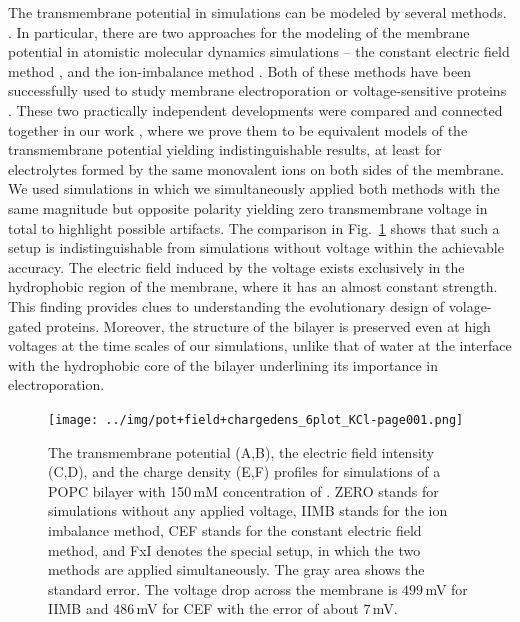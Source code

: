 The transmembrane potential in simulations can be modeled by several methods. \citep{Tieleman2001,Sin2015, Roux1997, sachs04_potential}.
In particular, 
there are two approaches for the modeling of 
the membrane potential in atomistic molecular dynamics simulations --
 the constant electric field method \citep{Roux1997,Roux2008,gumbart_constant_2012}, 
and
 the ion-imbalance method \citep{sachs04_potential,Delemotte2008}. 
Both of these methods have been successfully used to study membrane electroporation or voltage-sensitive proteins \citep{Vargas2012, bockmann_kinetics_2008, gumbart_constant_2012, kutzner_computational_2011, casciola_molecular_2014}. 
These two practically independent developments were compared and connected together in our work \citep{melcr16},
where we prove them to be equivalent models of the transmembrane potential yielding indistinguishable results, 
at least for electrolytes formed by the same monovalent ions on both sides of the membrane. 
We used simulations 
in which we simultaneously applied both methods
with the same magnitude but opposite polarity 
yielding zero transmembrane voltage in total 
to highlight possible artifacts. 
The comparison in Fig.~\ref{fig:potentialKCl} shows 
that such a setup is indistinguishable 
from simulations without voltage within the achievable accuracy. 
The electric field induced by the voltage 
exists exclusively in the hydrophobic region of the membrane,
where it has an almost constant strength. 
This finding provides clues to understanding the evolutionary design of volage-gated proteins. \citep{Vargas2012} 
Moreover,
the structure of the bilayer is preserved even at high voltages at the time scales of our simulations,
unlike that of water at the interface with the hydrophobic core of the bilayer
underlining its importance in electroporation. \citep{bu2017mechanics}

\begin{figure}[btp]
\begin{center}
\texttt{[image: ../img/pot+field+chargedens\_6plot\_KCl-page001.png]}
 \caption{The transmembrane potential (A,B), the electric field intensity (C,D), and the charge density (E,F) profiles for simulations of a POPC bilayer with 150\,mM concentration of . 
ZERO stands for simulations without any applied voltage,
IIMB stands for the ion imbalance method,
CEF  stands for the constant electric field method,
and FxI denotes the special setup, in which the two methods are applied simultaneously. 
The gray area shows the standard error. 
The voltage drop across the membrane is $499\,$mV for IIMB and $486\,$mV for CEF with the error of about $7\,$mV.  
}
\label{fig:potentialKCl}
\end{center}
\end{figure}

